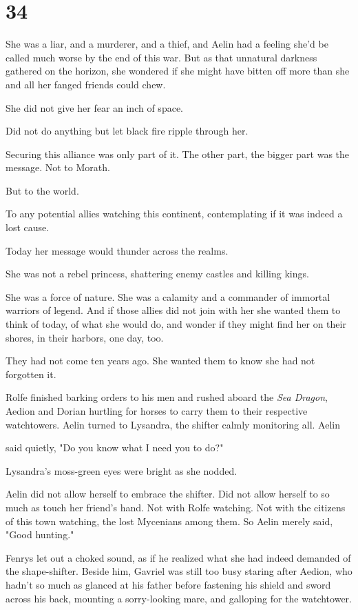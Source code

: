 
\chapter{34}

She was a liar, and a murderer, and a thief, and Aelin had a feeling she'd be called much worse by the end of this war. But as that unnatural darkness gathered on the horizon, she wondered if she might have bitten off more than she and all her fanged friends could chew.

She did not give her fear an inch of space.

Did not do anything but let black fire ripple through her.

Securing this alliance was only part of it. The other part, the bigger part  was the message. Not to Morath.

But to the world.

To any potential allies watching this continent, contemplating if it was indeed a lost cause.

Today her message would thunder across the realms.

She was not a rebel princess, shattering enemy castles and killing kings.

She was a force of nature. She was a calamity and a commander of immortal warriors of legend. And if those allies did not join with her
 she wanted them to think of today, of what she would do, and wonder if they might find her on their shores, in their harbors, one day, too.

They had not come ten years ago. She wanted them to know she had not forgotten it.

Rolfe finished barking orders to his men and rushed aboard the \emph{Sea Dragon}, Aedion and Dorian hurtling for horses to carry them to their respective watchtowers. Aelin turned to Lysandra, the shifter calmly monitoring all. Aelin

said quietly, "Do you know what I need you to do?"

Lysandra's moss-green eyes were bright as she nodded.

Aelin did not allow herself to embrace the shifter. Did not allow herself to so much as touch her friend's hand. Not with Rolfe watching. Not with the citizens of this town watching, the lost Mycenians among them. So Aelin merely said, "Good hunting."

Fenrys let out a choked sound, as if he realized what she had indeed demanded of the shape-shifter. Beside him, Gavriel was still too busy staring after Aedion, who hadn't so much as glanced at his father before fastening his shield and sword across his back, mounting a sorry-looking mare, and galloping for the watchtower.

